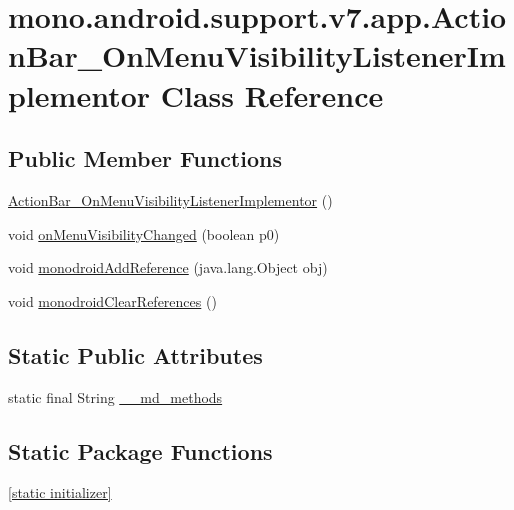 \hypertarget{classmono_1_1android_1_1support_1_1v7_1_1app_1_1_action_bar___on_menu_visibility_listener_implementor}{
\section{mono.android.support.v7.app.ActionBar\_\-OnMenuVisibilityListenerImplementor Class Reference}
\label{classmono_1_1android_1_1support_1_1v7_1_1app_1_1_action_bar___on_menu_visibility_listener_implementor}
}
\subsection*{Public Member Functions}
\begin{CompactItemize}
\item 
\hyperlink{classmono_1_1android_1_1support_1_1v7_1_1app_1_1_action_bar___on_menu_visibility_listener_implementor_635cd1ac43378cd527774a3cba11dff1}{ActionBar\_\-OnMenuVisibilityListenerImplementor} ()
\item 
void \hyperlink{classmono_1_1android_1_1support_1_1v7_1_1app_1_1_action_bar___on_menu_visibility_listener_implementor_273ad4963b11410f46b1e918b47526e5}{onMenuVisibilityChanged} (boolean p0)
\item 
void \hyperlink{classmono_1_1android_1_1support_1_1v7_1_1app_1_1_action_bar___on_menu_visibility_listener_implementor_120bb639390d4992edfcf6749c839108}{monodroidAddReference} (java.lang.Object obj)
\item 
void \hyperlink{classmono_1_1android_1_1support_1_1v7_1_1app_1_1_action_bar___on_menu_visibility_listener_implementor_888aa1c7efc221057deab7c4d44d1e86}{monodroidClearReferences} ()
\end{CompactItemize}
\subsection*{Static Public Attributes}
\begin{CompactItemize}
\item 
static final String \hyperlink{classmono_1_1android_1_1support_1_1v7_1_1app_1_1_action_bar___on_menu_visibility_listener_implementor_4514956c1b3554e5301274b9b8fb213f}{\_\-\_\-md\_\-methods}
\end{CompactItemize}
\subsection*{Static Package Functions}
\begin{CompactItemize}
\item 
\hyperlink{classmono_1_1android_1_1support_1_1v7_1_1app_1_1_action_bar___on_menu_visibility_listener_implementor_466f040b4ee30de3b346191768ffefd3}{\mbox{[}static initializer\mbox{]}}
\end{CompactItemize}
